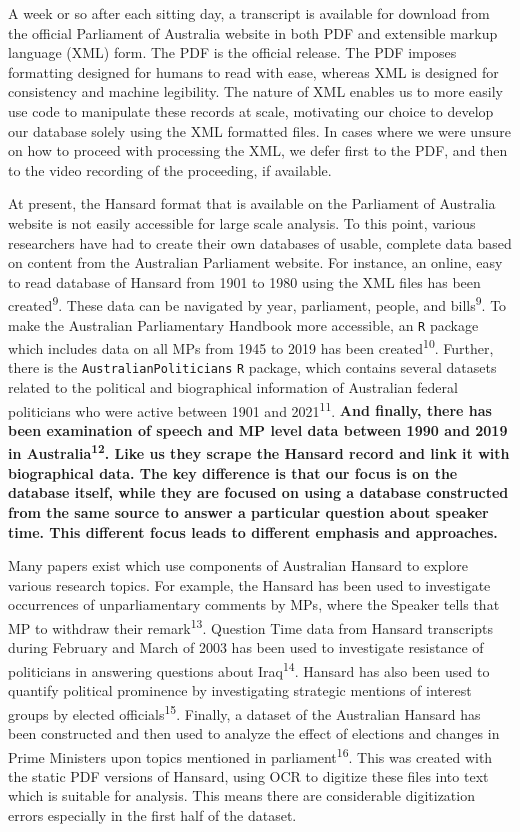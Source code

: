 \documentclass[
  letterpaper,
  DIV=11,
  numbers=noendperiod]{scrartcl}
\begin{document}
A week or so after each sitting day, a transcript is available for
download from the official Parliament of Australia website in both PDF
and extensible markup language (XML) form. The PDF is the official
release. The PDF imposes formatting designed for humans to read with
ease, whereas XML is designed for consistency and machine legibility.
The nature of XML enables us to more easily use code to manipulate these
records at scale, motivating our choice to develop our database solely
using the XML formatted files. In cases where we were unsure on how to
proceed with processing the XML, we defer first to the PDF, and then to
the video recording of the proceeding, if available.

At present, the Hansard format that is available on the Parliament of
Australia website is not easily accessible for large scale analysis. To
this point, various researchers have had to create their own databases
of usable, complete data based on content from the Australian Parliament
website. For instance, an online, easy to read database of Hansard from
1901 to 1980 using the XML files has been created\textsuperscript{9}.
These data can be navigated by year, parliament, people, and
bills\textsuperscript{9}. To make the Australian Parliamentary Handbook
more accessible, an \texttt{R} package which includes data on all MPs
from 1945 to 2019 has been created\textsuperscript{10}. Further, there
is the \texttt{AustralianPoliticians} \texttt{R} package, which contains
several datasets related to the political and biographical information
of Australian federal politicians who were active between 1901 and
2021\textsuperscript{11}. \textbf{And finally, there has been
examination of speech and MP level data between 1990 and 2019 in
Australia\textsuperscript{12}. Like us they scrape the Hansard record
and link it with biographical data. The key difference is that our focus
is on the database itself, while they are focused on using a database
constructed from the same source to answer a particular question about
speaker time. This different focus leads to different emphasis and
approaches.}

Many papers exist which use components of Australian Hansard to explore
various research topics. For example, the Hansard has been used to
investigate occurrences of unparliamentary comments by MPs, where the
Speaker tells that MP to withdraw their remark\textsuperscript{13}.
Question Time data from Hansard transcripts during February and March of
2003 has been used to investigate resistance of politicians in answering
questions about Iraq\textsuperscript{14}. Hansard has also been used to
quantify political prominence by investigating strategic mentions of
interest groups by elected officials\textsuperscript{15}. Finally, a
dataset of the Australian Hansard has been constructed and then used to
analyze the effect of elections and changes in Prime Ministers upon
topics mentioned in parliament\textsuperscript{16}. This was created
with the static PDF versions of Hansard, using OCR to digitize these
files into text which is suitable for analysis. This means there are
considerable digitization errors especially in the first half of the
dataset.
\end{document}
